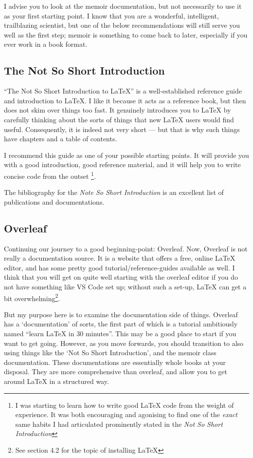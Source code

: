 \documentclass[11pt, oneside]{memoir}
\begin{document}
I advise you to look at the memoir documentation, but not necessarily to use it as your first starting point. I know that you are a wonderful, intelligent, trailblazing scientist, but one of the below recommendations will still serve you well as the first step; memoir is something to come back to later, especially if you ever work in a book format.

\subsection{The Not So Short Introduction}

``The Not So Short Introduction to LaTeX'' is a well-established reference guide and introduction to LaTeX. I like it because it acts as a reference book, but then does not skim over things too fast. It genuinely introduces you to LaTeX by carefully thinking about the sorts of things that new LaTeX users would find useful. Consequently, it is indeed not very short — but that is why such things have chapters and a table of contents.

I recommend this guide as one of your possible starting points. It will provide you with a good introduction, good reference material, and it will help you to write concise code from the outset \footnote{I was starting to learn how to write good LaTeX code from the weight of experience. It was both encouraging and agonising to find one of the \emph{exact} same habits I had articulated prominently stated in the \emph{Not So Short Introduction}}.

The bibliography for the \emph{Note So Short Introduction} is an excellent list of publications and documentations.

\subsection{Overleaf}

Continuing our journey to a good beginning-point: Overleaf. Now, Overleaf is not really a documentation source. It is a website that offers a free, online LaTeX editor, and has some pretty good tutorial/reference-guides available as well. I think that you will get on quite well starting with the overleaf editor if you do not have something like VS Code set up; without such a set-up, LaTeX can get a bit overwhelming\footnote{See section 4.2 for the topic of installing LaTeX}.

But my purpose here is to examine the documentation side of things. Overleaf has a `documentation' of sorts, the first part of which is a tutorial ambitiously named ``learn LaTeX in 30 minutes''. This may be a good place to start if you want to get going. However, as you move forwards, you should transition to also using things like the `Not So Short Introduction', and the memoir class documentation. These documentations are essentially whole books at your disposal. They are more comprehensive than overleaf, and allow you to get around LaTeX in a structured way.
\end{document}
